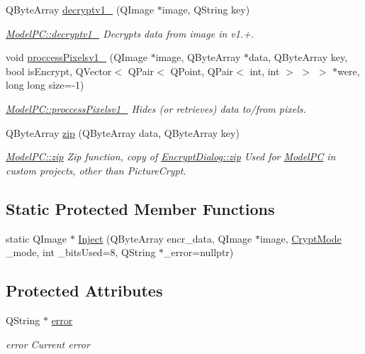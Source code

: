 \begin{DoxyCompactItemize}
Q\+Byte\+Array \hyperlink{class_model_p_c_a7a1f7d491e1bde16936190b9e90896b0}{decryptv1\+\_} (Q\+Image $\ast$image, Q\+String key)
\begin{DoxyCompactList}\small\item\em \hyperlink{class_model_p_c_a7a1f7d491e1bde16936190b9e90896b0}{Model\+P\+C\+::decryptv1\+\_} Decrypts data from image in v1.+. \end{DoxyCompactList}\item 
void \hyperlink{class_model_p_c_a5cdb4d1d61ff62ee9d45b496a7dbf1fb}{proccess\+Pixelsv1\+\_} (Q\+Image $\ast$image, Q\+Byte\+Array $\ast$data, Q\+Byte\+Array key, bool is\+Encrypt, Q\+Vector$<$ Q\+Pair$<$ Q\+Point, Q\+Pair$<$ int, int $>$ $>$ $>$ $\ast$were, long long size=-\/1)
\begin{DoxyCompactList}\small\item\em \hyperlink{class_model_p_c_a5cdb4d1d61ff62ee9d45b496a7dbf1fb}{Model\+P\+C\+::proccess\+Pixelsv1\+\_} Hides (or retrieves) data to/from pixels. \end{DoxyCompactList}\item 
Q\+Byte\+Array \hyperlink{class_model_p_c_afebbbfa4b07deba4f68fc6dfb50f353f}{zip} (Q\+Byte\+Array data, Q\+Byte\+Array key)
\begin{DoxyCompactList}\small\item\em \hyperlink{class_model_p_c_afebbbfa4b07deba4f68fc6dfb50f353f}{Model\+P\+C\+::zip} Zip function, copy of \hyperlink{class_encrypt_dialog_a2bff820a3df4ddc36ecb07ed74b7138a}{Encrypt\+Dialog\+::zip} Used for \hyperlink{class_model_p_c}{Model\+PC} in custom projects, other than Picture\+Crypt. \end{DoxyCompactList}\end{DoxyCompactItemize}
\subsection*{Static Protected Member Functions}
\begin{DoxyCompactItemize}
\item 
static Q\+Image $\ast$ \hyperlink{class_model_p_c_a11c3709b87ca83bce474d377f35660ac}{Inject} (Q\+Byte\+Array encr\+\_\+data, Q\+Image $\ast$image, \hyperlink{class_model_p_c_a296dd7afe3e1c49b3da25fd644fe4ceb}{Crypt\+Mode} \+\_\+mode, int \+\_\+bits\+Used=8, Q\+String $\ast$\+\_\+error=nullptr)
\end{DoxyCompactItemize}
\subsection*{Protected Attributes}
\begin{DoxyCompactItemize}
\item 
Q\+String $\ast$ \hyperlink{class_model_p_c_a4e5a9c0ca1f06fe5bc478b6bf248c37c}{error}
\begin{DoxyCompactList}\small\item\em error Current error \end{DoxyCompactList}\end{DoxyCompactItemize}



